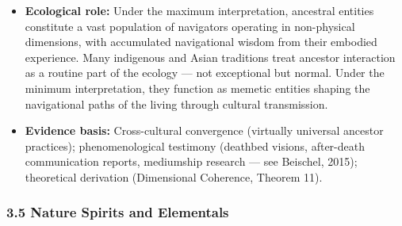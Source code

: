 \begin{itemize}[nosep,leftmargin=*]
  \item \textbf{Ecological role:} Under the maximum interpretation, ancestral entities constitute a vast population of navigators operating in non-physical dimensions, with accumulated navigational wisdom from their embodied experience. Many indigenous and Asian traditions treat ancestor interaction as a routine part of the ecology — not exceptional but normal. Under the minimum interpretation, they function as memetic entities shaping the navigational paths of the living through cultural transmission.
  \item \textbf{Evidence basis:} Cross-cultural convergence (virtually universal ancestor practices); phenomenological testimony (deathbed visions, after-death communication reports, mediumship research — see Beischel, 2015); theoretical derivation (Dimensional Coherence, Theorem 11).
\end{itemize}


\subsubsection*{3.5 Nature Spirits and Elementals}

